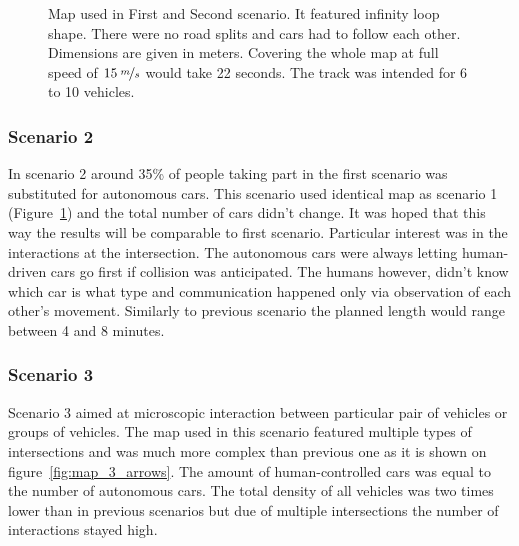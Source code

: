 \documentclass[11pt,english,twoside]{article}
\begin{document}
\begin{figure}[!] %
\caption{Map used in First and Second scenario. It featured infinity loop shape. There were no road splits and cars had to follow each other. Dimensions are given in meters. Covering the whole map at full speed of $15\:\nicefrac{m}{s}$ would take 22 seconds. The track was intended for 6 to 10 vehicles.}
\label{fig:map_1_arrows}
\end{figure}


\subsubsection{Scenario 2}

In scenario 2 around 35\% of people taking part in the first scenario was substituted for autonomous cars. This scenario used identical map as scenario 1 (Figure~\ref{fig:map_1_arrows}) and the total number of cars didn't change. It was hoped that this way the results will be comparable to first scenario. Particular interest was in the interactions at the intersection. The autonomous cars were always letting human-driven cars go first if collision was anticipated. The humans however, didn't know which car is what type and communication happened only via observation of each other's movement. Similarly to previous scenario the planned length would range between 4 and 8 minutes.


\subsubsection{Scenario 3}

Scenario 3 aimed at microscopic interaction between particular pair of vehicles or groups of vehicles. The map used in this scenario featured multiple types of intersections and was much more complex than previous one as it is shown on figure~\ref{fig:map_3_arrows}. The amount of human-controlled cars was equal to the number of autonomous cars. The total density of all vehicles was two times lower than in previous scenarios but due of multiple intersections the number of interactions stayed high.
\end{document}
